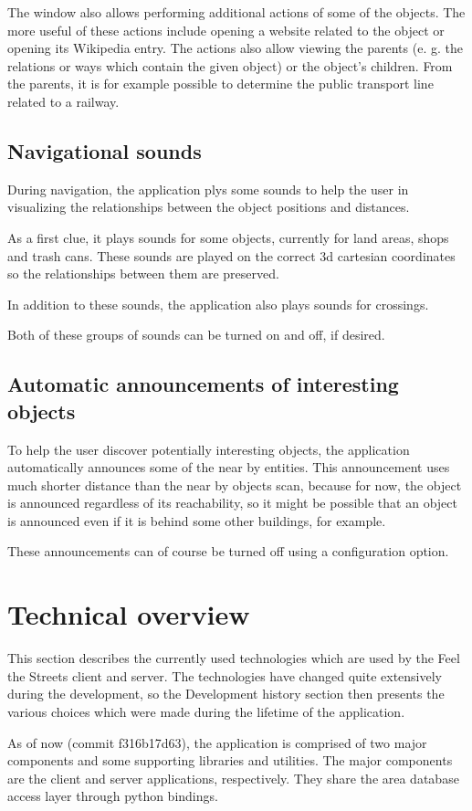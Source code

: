 \documentclass[nolof,digital]{fithesis3}
\begin{document}
The window also allows performing additional actions of some of the objects. The more useful of these actions include opening a website related to the object or opening its Wikipedia entry. The actions also allow viewing the parents (e. g. the relations or ways which contain the given object) or the object's children. From the parents, it is for example possible to determine the public transport line related to a railway.
\subsection{Navigational sounds}
During navigation, the application plys some sounds to help the user in visualizing the relationships between the object positions and distances.

As a first clue, it plays sounds for some objects, currently for land areas, shops and trash cans. These sounds are played on the correct 3d cartesian coordinates so the relationships between them are preserved.

In addition to these sounds, the application also plays sounds for crossings.

Both of these groups of sounds can be turned on and off, if desired.
\subsection{Automatic announcements of interesting objects}
To help the user discover potentially interesting objects, the application automatically announces some of the near by entities. This announcement uses much shorter distance than the near by objects scan, because for now, the object is announced regardless of its reachability, so it might be possible that an object is announced even if it is behind some other buildings, for example.

These announcements can of course be turned off using a configuration option.
\section{Technical overview}
This section describes the currently used technologies which are used by the Feel the Streets client and server. The technologies have changed quite extensively during the development, so the Development history section then presents the various choices which were made during the lifetime of the application.

As of now (commit f316b17d63), the application is comprised of two major components and some supporting libraries and utilities. The major components are the client and server applications, respectively. They share the area database access layer through python bindings.
\end{document}
